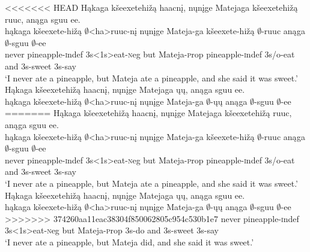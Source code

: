 \documentclass[output=paper]{LSP/langsci}
\begin{document}
\begin{exe}
\ex
\begin{xlist}
\ex
<<<<<<< HEAD
\glll Hąkaga kšeexetehižą haacnį, nųnįge Matejaga kšeexetehižą ruuc, anąga sguu ee.\\
hąkaga kšeexete-hižą $\emptyset$<ha>ruuc-nį nųnįge Mateja-ga kšeexete-hižą $\emptyset$-ruuc anąga $\emptyset$-sguu $\emptyset$-ee\\
never pineapple-{\textsc indef} {\textsc 3s<1s>}eat-{\textsc neg} but Mateja-{\textsc prop} pineapple-{\textsc indef} {\textsc 3s/o}-eat and {\textsc 3s}-sweet {\textsc 3s}-say\\
\trans `I never ate a pineapple, but Mateja ate a pineapple, and she said it was sweet.'
\ex
\glll Hąkaga kšeexetehižą haacnį, nųnįge Matejaga ųų, anąga sguu ee.\\
hąkaga kšeexete-hižą $\emptyset$<ha>ruuc-nį nųnįge Mateja-ga $\emptyset$-ųų anąga $\emptyset$-sguu $\emptyset$-ee\\
=======
\glll H\k{a}kaga k\v{s}eexetehi\v{z}\k{a} haacn\k{i}, n\k{u}n\k{i}ge Matejaga k\v{s}eexetehi\v{z}\k{a} ruuc, an\k{a}ga sguu ee.\\
h\k{a}kaga k\v{s}eexete-hi\v{z}\k{a} $\emptyset$<ha>ruuc-n\k{i} n\k{u}n\k{i}ge Mateja-ga k\v{s}eexete-hi\v{z}\k{a} $\emptyset$-ruuc an\k{a}ga $\emptyset$-sguu $\emptyset$-ee\\
never pineapple-{\textsc indef} {\textsc 3s<1s>}eat-{\textsc neg} but Mateja-{\textsc prop} pineapple-{\textsc indef} {\textsc 3s/o}-eat and {\textsc 3s}-sweet {\textsc 3s}-say\\
\trans `I never ate a pineapple, but Mateja ate a pineapple, and she said it was sweet.'
\ex
\glll H\k{a}kaga k\v{s}eexetehi\v{z}\k{a} haacn\k{i}, n\k{u}n\k{i}ge Matejaga \k{u}\k{u}, an\k{a}ga sguu ee.\\
h\k{a}kaga k\v{s}eexete-hi\v{z}\k{a} $\emptyset$<ha>ruuc-n\k{i} n\k{u}n\k{i}ge Mateja-ga $\emptyset$-\k{u}\k{u} an\k{a}ga $\emptyset$-sguu $\emptyset$-ee\\
>>>>>>> 374260aa11eac38304f850062805c954c530b1e7
never pineapple-{\textsc indef} {\textsc 3s<1s>}eat-{\textsc neg} but Mateja-{\textsc prop} {\textsc 3s}-do and {\textsc 3s}-sweet {\textsc 3s}-say\\
\trans `I never ate a pineapple, but Mateja did, and she said it was sweet.'
\end{xlist}
\end{exe}

\begin{exe}
\end{exe}
\end{document}
